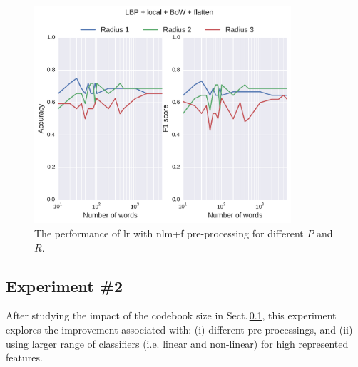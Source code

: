 \begin{figure}
\centering
\includegraphics[width=0.85\textwidth]{figure2}
\caption{The performance of \ac{lr} with \ac{nlm}+\ac{f} pre-processing for different $P$ and $R$.}
\label{fig:RBOW}
\end{figure}




\subsection{Experiment \#2}\label{subsec:exp2}
%
%
%
%

After studying the impact of the codebook size in Sect.\,\ref{subsec:exp2}, this experiment explores the improvement associated with: (i) different pre-processings, and (ii) using larger range of classifiers (i.e. linear and non-linear) for high represented features.

